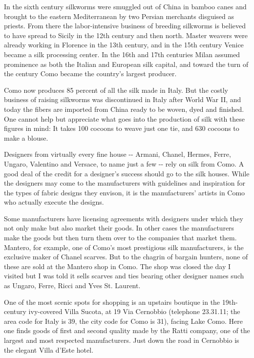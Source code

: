 In the sixth century silkworms were smuggled out of China in bamboo
canes and brought to the eastern Mediterranean by two Persian merchants
disguised as priests. From there the labor-intensive business of
breeding silkworms is believed to have spread to Sicily in the 12th
century and then north. Master weavers were already working in Florence
in the 13th century, and in the 15th century Venice became a silk
processing center. In the 16th and 17th centuries Milan assumed
prominence as both the Italian and European silk capital, and toward the
turn of the century Como became the country's largest producer.

Como now produces 85 percent of all the silk made in Italy. But the
costly business of raising silkworms was discontinued in Italy after
World War II, and today the fibers are imported from China ready to be
woven, dyed and finished. One cannot help but appreciate what goes into
the production of silk with these figures in mind: It takes 100 cocoons
to weave just one tie, and 630 cocoons to make a blouse.

Designers from virtually every fine house -\/- Armani, Chanel, Hermes,
Ferre, Ungaro, Valentino and Versace, to name just a few -\/- rely on
silk from Como. A good deal of the credit for a designer's success
should go to the silk houses. While the designers may come to the
manufacturers with guidelines and inspiration for the types of fabric
designs they envison, it is the manufacturers' artists in Como who
actually execute the designs.

Some manufacturers have licensing agreements with designers under which
they not only make but also market their goods. In other cases the
manufacturers make the goods but then turn them over to the companies
that market them. Mantero, for example, one of Como's most prestigious
silk manufacturers, is the exclusive maker of Chanel scarves. But to the
chagrin of bargain hunters, none of these are sold at the Mantero shop
in Como. The shop was closed the day I visited but I was told it sells
scarves and ties bearing other designer names such as Ungaro, Ferre,
Ricci and Yves St. Laurent.

One of the most scenic spots for shopping is an upstairs boutique in the
19th-century ivy-covered Villa Sucota, at 19 Via Cernobbio (telephone
23.31.11; the area code for Italy is 39, the city code for Como is 31),
facing Lake Como. Here one finds goods of first and second quality made
by the Ratti company, one of the largest and most respected
manufacturers. Just down the road in Cernobbio is the elegant Villa
d'Este hotel.

